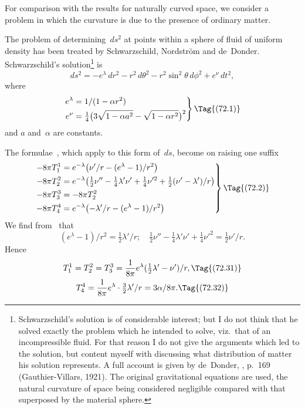 \documentclass[12pt]{book}
\begin{document}
%
%
%

For comparison with the results for naturally curved space, we consider a
problem in which the curvature is due to the presence of ordinary matter.

The problem of determining~$ds^{2}$ at points within a sphere of fluid of uniform
density has been treated by Schwarzschild, Nordström and de~Donder.
Schwarzschild's solution\footnote
  {Schwarzschild's solution is of considerable interest; but I do not think that he solved exactly
  the problem which he intended to solve, viz.\ that of an incompressible fluid. For that reason I do
  not give the arguments which led to the solution, but content myself with discussing what distribution
  of matter his solution represents. A full account is given by de~Donder, , p.~169 (Gauthier-Villars, 1921). The original gravitational equations are used, the
  natural curvature of space being considered negligible compared with that superposed by the
  material sphere.}
is
\[
ds^{2} = -e^{\lambda}\, dr^{2} - r^{2}\, d\theta^{2} - r^{2}\sin^{2}\theta\, d\phi^{2} + e^{\nu}\, dt^{2},
\]
where
\[
\left.
\begin{aligned}
  e^{\lambda} &= 1/(1 - \alpha r^{2}) \\
  e^{\nu} &= \tfrac{1}{4}\bigl(3\sqrt{1 - \alpha a^{2}} - \sqrt{1 - \alpha r^{2}}\bigr)^{2}
\end{aligned}
\right\}
\Tag{(72.1)}
\]
and $a$ and~$\alpha$ are constants.

The formulae~, which apply to this form of~$ds$, become on raising one
suffix
\[
\left.
\begin{aligned}
  -8\pi T_{1}^{1} &= e^{-\lambda} \bigl(\nu'/r - (e^{\lambda} - 1)/r^{2}\bigr)\\
  -8\pi T_{2}^{2} &= e^{-\lambda} \bigl(\tfrac{1}{2} \nu'' - \tfrac{1}{4}\lambda'\nu' + \tfrac{1}{4}\nu'^{2} + \tfrac{1}{2}(\nu' - \lambda')/r\bigr)\\
  -8\pi T_{3}^{3} &= -8\pi T_{2}^{2}\\
  -8\pi T_{4}^{4} &= e^{-\lambda} \bigl(-\lambda'/r - (e^{\lambda} - 1)/r^{2}\bigr)
\end{aligned}
\right\}
\Tag{(72.2)}
\]
We find from~ that
\[
(e^{\lambda} - 1)/r^{2} = \tfrac{1}{2}\lambda'/r;\quad
\tfrac{1}{2} \nu'' - \tfrac{1}{4}\lambda'\nu' + \tfrac{1}{4}\nu'^{2}  = \tfrac{1}{2}\nu'/r.
\]
Hence
\begin{gather*}
  T_{1}^{1} = T_{2}^{2} = T_{3}^{3} = \frac{1}{8\pi} e^{\lambda}(\tfrac{1}{2}\lambda' - \nu')/r,
\Tag{(72.31)} \\
T_{4}^{4} = \frac{1}{8\pi} e^{\lambda} \cdot \tfrac{3}{2}\lambda'/r
= 3\alpha/8\pi.
\Tag{(72.32)}
\end{gather*}
\end{document}
